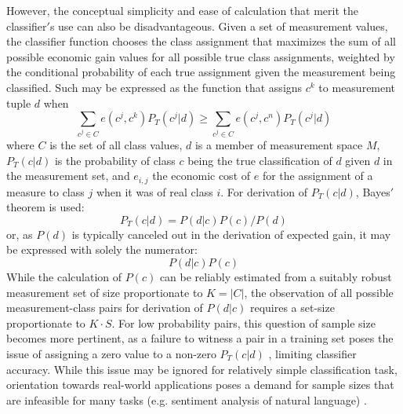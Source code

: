 \documentclass[10pt, conference]{IEEEtran}
\begin{document}
However, the conceptual simplicity and ease of calculation that merit the classifier$'$s use can also be disadvantageous. Given a set of measurement values, the classifier function chooses the class assignment that maximizes the sum of all possible economic gain  values for all possible true class assignments, weighted by the conditional probability of each true assignment given the measurement being classified. Such may be expressed as the function that assigns $c^k$ to measurement tuple $d$ when
\begin{equation}\label{eq:expectedGain}
\sum_{c^j \in C}{e(c^j, c^k)P_T(c^j|d)} \geq \sum_{c^j \in C}{e(c^j,c^n)P_T(c^j|d)} 
\end{equation}
where $C$ is the set of all class values,  $d$ is a member of measurement space $M$, $P_T(c|d)$ is the probability of class $c$ being the true classification of $d$ given $d$ in the measurement set, and $e_{i,j}$  the economic cost of $e$ for the assignment of a measure to class $j$ when it was of real class $i$.  For derivation of $P_T(c|d)$, Bayes$'$ theorem is used:
\begin{equation}
P_T(c|d)=P(d|c)P(c)/P(d)
\end{equation}
or, as $P(d)$ is typically canceled out in the derivation of expected gain, it may be expressed with solely the numerator:
\begin{equation}\label{eq:BayesNumerator}
P(d|c)P(c)
\end{equation}
While the calculation of $P(c)$ can be reliably estimated from a suitably robust measurement set of size proportionate to $K = |C|$, the observation of all possible measurement-class pairs for derivation of $P(d|c)$ requires a set-size proportionate to $K\cdot S$. For low probability pairs, this question of sample size becomes more pertinent, as a failure to witness a pair in a training set poses the issue of assigning a zero value to a non-zero $P_T(c|d)$ \cite{b1}, limiting classifier accuracy. While this issue may be ignored for relatively simple classification task, orientation towards real-world applications poses a demand for sample sizes that are infeasible for many tasks (e.g. sentiment analysis of natural language) \cite{b2}. 
\end{document}
